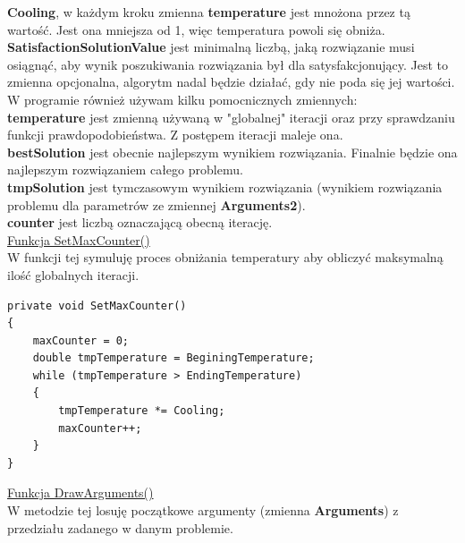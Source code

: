 \documentclass[twoside]{projektInzynierskiMS1}
\newcommand{\si}{ś}
\begin{document}
\textbf{Cooling}, w każdym kroku zmienna \textbf{temperature} jest mnożona przez tą warto\si ć. Jest ona mniejsza od 1, więc temperatura powoli się obniża. \\

\textbf{SatisfactionSolutionValue} jest minimalną liczbą, jaką rozwiązanie musi osiągnąć, aby wynik poszukiwania rozwiązania był dla satysfakcjonujący. Jest to zmienna opcjonalna, algorytm nadal będzie działać, gdy nie poda się jej warto\si ci.\\

W programie również używam kilku pomocnicznych zmiennych: \\

\textbf{temperature} jest zmienną używaną w "globalnej" iteracji oraz przy sprawdzaniu funkcji prawdopodobieństwa. Z postępem iteracji maleje ona. \\

\textbf{bestSolution} jest obecnie najlepszym wynikiem rozwiązania. Finalnie będzie ona najlepszym rozwiązaniem całego problemu. \\

\textbf{tmpSolution} jest tymczasowym wynikiem rozwiązania (wynikiem rozwiązania problemu dla parametrów ze zmiennej \textbf{Arguments2}). \\

\textbf{counter} jest liczbą oznaczającą obecną iterację. \\

\underline{Funkcja SetMaxCounter()} \\
W funkcji tej symuluję proces obniżania temperatury aby obliczyć maksymalną ilo\si ć globalnych iteracji. \\
\begin{verbatim}
private void SetMaxCounter()
{
    maxCounter = 0;
    double tmpTemperature = BeginingTemperature;
    while (tmpTemperature > EndingTemperature)
    {
        tmpTemperature *= Cooling;
        maxCounter++;
    }
}
\end{verbatim}

\underline{Funkcja DrawArguments()} \\
W metodzie tej losuję początkowe argumenty (zmienna \textbf{Arguments}) z przedziału zadanego w danym problemie. \\
\end{document}
